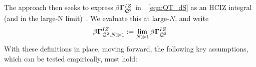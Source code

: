 The \SETOL approach then seeks to express $\beta\mathbf{\Gamma}^{IZ}_{\bar{\mathcal{Q}}^{2}}$ in~\EQN~\ref{eqn:QT_dS} as an HCIZ integral (and in the large-N limit)~\cite{potters_bouchaud_2020,Tanaka2007,Tanaka2008}.
We evaluate this at large-$N$, and write
\begin{equation}
  \beta\mathbf{\Gamma}^{IZ}_{\bar{\mathcal{Q}}^{2},N\gg 1}:=\lim_{N\gg 1}\beta\mathbf{\Gamma}^{IZ}_{\bar{\mathcal{Q}}^{2}}
\end{equation}
With these definitions in place, moving forward, the following key assumptions, which can be tested empirically, must hold:
